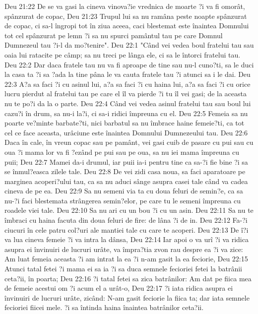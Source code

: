 Deu 21:22  De se va gasi la cineva vinova?ie vrednica de moarte ?i va fi omorât, spânzurat de copac,
Deu 21:23  Trupul lui sa nu ramâna peste noapte spânzurat de copac, ci sa-l îngropi tot în ziua aceea, caci blestemat este înaintea Domnului tot cel spânzurat pe lemn ?i sa nu spurci pamântul tau pe care Domnul Dumnezeul tau ?i-l da mo?tenire".
Deu 22:1  "Când vei vedea boul fratelui tau sau oaia lui ratacite pe câmp; sa nu treci pe lânga ele, ci sa le întorci fratelui tau.
Deu 22:2  Dar daca fratele tau nu va fi aproape de tine sau nu-l cuno?ti, sa le duci la casa ta ?i sa ?ada la tine pâna le va cauta fratele tau ?i atunci sa i le dai.
Deu 22:3  A?a sa faci ?i cu asinul lui, a?a sa faci ?i cu haina lui, a?a sa faci ?i cu orice lucru pierdut al fratelui tau pe care el îl va pierde ?i tu îl vei gasi; de la aceasta nu te po?i da la o parte.
Deu 22:4  Când vei vedea asinul fratelui tau sau boul lui cazu?i în drum, sa nu-i la?i, ci sa-i ridici împreuna cu el.
Deu 22:5  Femeia sa nu poarte ve?minte barbate?ti, nici barbatul sa nu îmbrace haine femeie?ti, ca tot cel ce face aceasta, urâciune este înaintea Domnului Dumnezeului tau.
Deu 22:6  Daca în cale, în vreun copac sau pe pamânt, vei gasi cuib de pasare cu pui sau cu oua ?i mama lor va fi ?ezând pe pui sau pe oua, sa nu iei mama împreuna cu puii;
Deu 22:7  Mamei da-i drumul, iar puii ia-i pentru tine ca sa-?i fie bine ?i sa se înmul?easca zilele tale.
Deu 22:8  De vei zidi casa noua, sa faci aparatoare pe marginea acoperi?ului tau, ca sa nu aduci sânge asupra casei tale când va cadea cineva de pe ea.
Deu 22:9  Sa nu semeni via ta cu doua feluri de semin?e, ca sa nu-?i faci blestemata strângerea semin?elor, pe care tu le semeni împreuna cu roadele viei tale.
Deu 22:10  Sa nu ari cu un bou ?i cu un asin.
Deu 22:11  Sa nu te îmbraci cu haina facuta din doua feluri de fire: de lâna ?i de in.
Deu 22:12  Fa-?i ciucuri în cele patru col?uri ale mantiei tale cu care te acoperi.
Deu 22:13  De î?i va lua cineva femeie ?i va intra la dânsa,
Deu 22:14  Iar apoi o va urî ?i va ridica asupra ei învinuiri de lucruri urâte, va împra?tia zvon rau despre ea ?i va zice: Am luat femeia aceasta ?i am intrat la ea ?i n-am gasit la ea feciorie,
Deu 22:15  Atunci tatal fetei ?i mama ei sa ia ?i sa duca semnele fecioriei fetei la batrânii ceta?ii, în poarta;
Deu 22:16  ?i tatal fetei sa zica batrânilor: Am dat pe fiica mea de femeie acestui om ?i acum el a urât-o,
Deu 22:17  ?i iata ridica asupra ei învinuiri de lucruri urâte, zicând: N-am gasit feciorie la fiica ta; dar iata semnele fecioriei fiicei mele. ?i sa întinda haina înaintea batrânilor ceta?ii.
